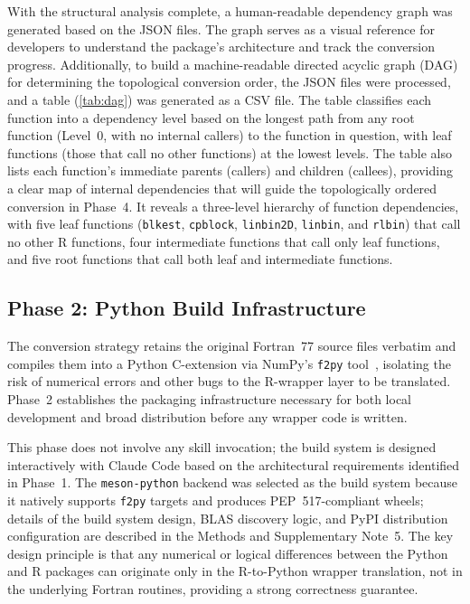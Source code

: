 \documentclass[12pt,a4paper]{article}
\newcommand{\pkg}[1]{\texttt{#1}}
\newcommand{\suppnote}[1]{Supplementary Note~#1}
\begin{document}
With the structural analysis complete, a human-readable dependency graph was generated based on the JSON files. The graph serves as a visual reference for developers to understand the package's architecture and track the conversion progress. Additionally, to build a machine-readable directed acyclic graph (DAG) for determining the topological conversion order, the JSON files were processed, and a table (\ref{tab:dag}) was generated as a CSV file. The table classifies each function into a dependency level based on the longest path from any root function (Level~0, with no internal callers) to the function in question, with leaf functions (those that call no other functions) at the lowest levels. The table also lists each function's immediate parents (callers) and children (callees), providing a clear map of internal dependencies that will guide the topologically ordered conversion in Phase~4. It reveals a three-level hierarchy of function dependencies, with five leaf functions (\texttt{blkest}, \texttt{cpblock}, \texttt{linbin2D}, \texttt{linbin}, and \texttt{rlbin}) that call no other R functions, four intermediate functions that call only leaf functions, and five root functions that call both leaf and intermediate functions.

\subsection{Phase 2: Python Build Infrastructure}
\label{sec:phase2}

The conversion strategy retains the original Fortran~77 source files verbatim and compiles them into a Python C-extension via NumPy's \pkg{f2py} tool~\cite{peterson2009f2py}, isolating the risk of numerical errors and other bugs to the R-wrapper layer to be translated. Phase~2 establishes the packaging infrastructure necessary for both local development and broad distribution before any wrapper code is written.

This phase does not involve any skill invocation; the build system is designed interactively with Claude Code based on the architectural requirements identified in Phase~1. The \texttt{meson-python} backend was selected as the build system because it natively supports \pkg{f2py} targets and produces PEP~517-compliant wheels; details of the build system design, BLAS discovery logic, and PyPI distribution configuration are described in the Methods and \suppnote{5}. The key design principle is that any numerical or logical differences between the Python and R packages can originate only in the R-to-Python wrapper translation, not in the underlying Fortran routines, providing a strong correctness guarantee.
\end{document}
